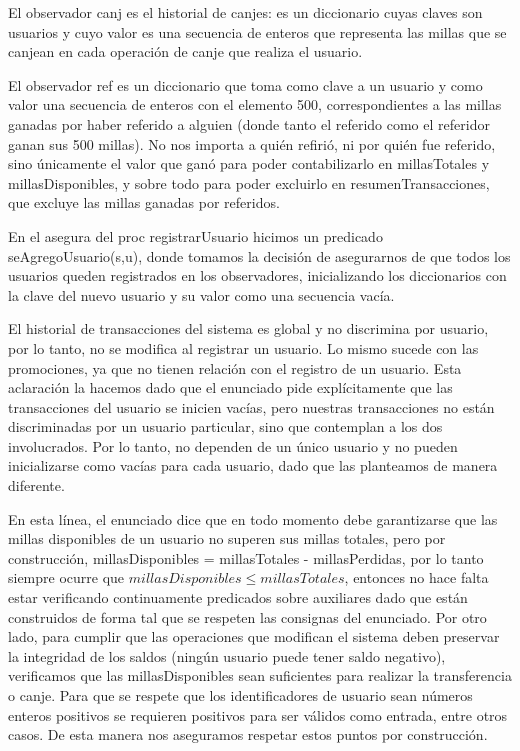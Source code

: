 \documentclass[11pt,a4paper]{article}
\begin{document}
El observador canj es el historial de canjes: es un diccionario cuyas claves son usuarios y cuyo valor es una secuencia de enteros que representa las millas que se canjean en cada operación de canje que realiza el usuario.

El observador ref es un diccionario que toma como clave a un usuario y como valor una secuencia de enteros con el elemento 500, correspondientes a las millas ganadas por haber referido a alguien (donde tanto el referido como el referidor ganan sus 500 millas). No nos importa a quién refirió, ni por quién fue referido, sino únicamente el valor que ganó para poder contabilizarlo en millasTotales y millasDisponibles, y sobre todo para poder excluirlo en resumenTransacciones, que excluye las millas ganadas por referidos.

En el asegura del proc registrarUsuario hicimos un predicado seAgregoUsuario(s,u), donde tomamos la decisión de asegurarnos de que todos los usuarios queden registrados en los observadores, inicializando los diccionarios con la clave del nuevo usuario y su valor como una secuencia vacía.

El historial de transacciones del sistema es global y no discrimina por usuario, por lo tanto, no se modifica al registrar un usuario. Lo mismo sucede con las promociones, ya que no tienen relación con el registro de un usuario. Esta aclaración la hacemos dado que el enunciado pide explícitamente que las transacciones del usuario se inicien vacías, pero nuestras transacciones no están discriminadas por un usuario particular, sino que contemplan a los dos involucrados. Por lo tanto, no dependen de un único usuario y no pueden inicializarse como vacías para cada usuario, dado que las planteamos de manera diferente.

En esta línea, el enunciado dice que en todo momento debe garantizarse que las millas disponibles de un usuario no superen sus millas totales, pero por construcción, millasDisponibles = millasTotales - millasPerdidas, por lo tanto siempre ocurre que $millasDisponibles \leq millasTotales$, entonces no hace falta estar verificando continuamente predicados sobre auxiliares dado que están construidos de forma tal que se respeten las consignas del enunciado. Por otro lado, para cumplir que las operaciones que modifican el sistema deben preservar la integridad de los saldos (ningún usuario puede tener saldo negativo), verificamos que las millasDisponibles sean suficientes para realizar la transferencia o canje. Para que se respete que los identificadores de usuario sean números enteros positivos se requieren positivos para ser válidos como entrada, entre otros casos. De esta manera nos aseguramos respetar estos puntos por construcción.
\end{document}
